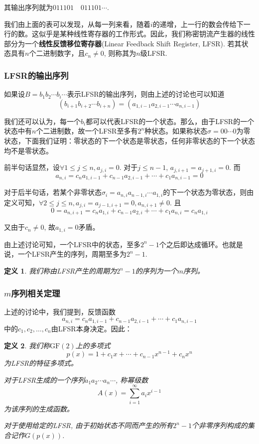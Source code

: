\documentclass[UTF8]{ctexrep}
\def\pth#1{\left( {#1}\right)}
\def\GF{\mathrm{GF}}
\newtheorem{Definition}{\hspace{2em}定义}[chapter]
\newenvironment{prove}{\begin{mdframed}[backgroundcolor=gray!10,roundcorner=8pt]}{\end{mdframed}}
\begin{document}
其输出序列就为$011101\quad 011101\cdots$.\par
我们由上面的表可以发现，从每一列来看，随着$i$的递增，上一行的数会传给下一行的数。这似乎是某种线性寄存器的工作形式。因此，我们称密钥流产生器的线性部分为一个\textbf{线性反馈移位寄存器}(Linear Feedback Shift Register, LFSR). 若其状态具有$n$个二进制数字，且$c_n\neq 0$, 则称其为$n$级LFSR.
\subsubsection{LFSR的输出序列}
如果设$B=b_1b_2\cdots b_i\cdots $表示LFSR的输出序列，则由上述的讨论也可以知道
\begin{equation}
    \pth{b_{i+1}b_{i+2}\cdots b_{i+n}}=\pth{a_{1, i-1}a_{2, i-1}\cdots a_{n, i-1}}
\end{equation}

我们还可以认为，每一个$b_i$都可以代表LFSR的一个状态。那么，由于LFSR的一个状态中有$n$个二进制数，故一个LFSR至多有$2^n$种状态。如果称状态$\sigma=00\cdots 0$为零状态，下面我们证明：零状态的下一个状态是零状态，任何非零状态的下一个状态均不是零状态。
\begin{prove}
前半句话显然，设$\forall 1\leq j\leq n, a_{j, i}=0$. 对于$j\leq n-1$, $a_{j, i+1}=a_{j+1, i}=0$. 而
\[a_{n, i}=c_na_{1, i-1}+c_{n-1}a_{2, i-1}+\cdots +c_1a_{n, i-1}=0\]

对于后半句话，若某个非零状态$\sigma_i=a_{n, i}a_{n-1, i}\cdots a_{1, i}$的下一个状态为零状态，则由定义可知，$\forall 2\leq j\leq n, a_{j, i}=a_{j-1, i+1}=0, a_{n, i+1}\neq 0$. 且
\[0=a_{n, i+1}=c_na_{1, i}+c_{n-1}a_{2, i}+\cdots +c_1a_{n, i}=c_na_{1, i}\]

又由于$c_n\neq 0$, 故$a_{1, i}=0$矛盾。
\end{prove}

由上述讨论可知，一个LFSR中的状态，至多$2^n-1$个之后即达成循环。也就是说，一个LFSR产生的序列，周期至多为$2^n-1$. 
\begin{Definition}
    我们称由LFSR产生的周期为$2^n-1$的序列为一个$m$序列。
\end{Definition}
\subsubsection{$m$序列相关定理}
上述的讨论中，我们提到，反馈函数
\[a_{n, i}=c_na_{1, i-1}+c_{n-1}a_{2, i-1}+\cdots +c_1a_{n, i-1}\]
中的$c_1, c_2,\ldots ,c_n$由LFSR本身决定。因此：
\begin{Definition}
    我们称$\GF\pth{2}$上的多项式
\begin{equation}
    p(x)=1+c_1x+\cdots +c_{n-1}x^{n-1}+c_nx^n
\end{equation}
为LFSR的特征多项式。\par
对于LFSR生成的一个序列$a_1a_2\cdots a_n\cdots$, 称幂级数
\begin{equation}
    A\pth{x}=\sum_{i=1}^{\infty}a_ix^{i-1}
\end{equation}
为该序列的生成函数。\par
对于使用给定的LFSR, 由于初始状态不同而产生的所有$2^n-1$个非零序列构成的集合记作$G\pth{p\pth{x}}$.
\end{Definition}
\end{document}

